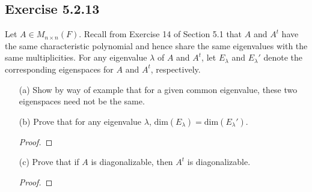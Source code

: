 \subsection*{Exercise 5.2.13} Let \( A \in {M}_{n \times n}(F)  \). Recall from Exercise 14 of Section 5.1 that \( A  \) and \( A^{t} \) have the same characteristic polynomial and hence share the same eigenvalues with the same multiplicities. For any eigenvalue \( \lambda  \) of \( A  \) and \( A^{t} \), let \( {E}_{\lambda} \) and \( {E}_{\lambda}' \) denote the corresponding eigenspaces for \( A  \) and \( A^{t} \), respectively.
\begin{enumerate}
    \item[(a)] Show by way of example that for a given common eigenvalue, these two eigenspaces need not be the same.
        \begin{solution}
        
        \end{solution}
    \item[(b)] Prove that for any eigenvalue \( \lambda  \), \( \text{dim}({E}_{\lambda}) = \text{dim}({E}_{\lambda}') \).
        \begin{proof}
        
        \end{proof}
    \item[(c)] Prove that if \( A  \) is diagonalizable, then \( A^{t}  \) is diagonalizable.
        \begin{proof}
        
        \end{proof}
\end{enumerate}
